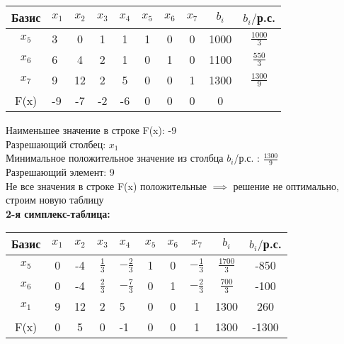 \begin{center}
    \begin{tabular}{|c | g c c c c c c c c|} 
         \hline
            Базис & $x_1$ & $x_2$ & $x_3$ & $x_4$ & $x_5$ & $x_6$ & $x_7$ & $b_i$ & $b_i/$р.с.\\
         \hline
            $x_5$ & 3 & 0 & 1 & 1 & 1 & 0 & 0 & 1000 & $\frac{1000}{3}$\\
         \hline
            $x_6$ & 6 & 4 & 2 & 1 & 0 & 1 & 0 & 1100 & $\frac{550}{3}$ \\
        \hline
            $x_7$ & 9 & 12 & 2 & 5 & 0 & 0 & 1 & 1300 & $\frac{1300}{9}$ \\
         \hline
            F(x) & -9 & -7 & -2 & -6 & 0 & 0 & 0 & 0 &\\
         \hline
    \end{tabular}
\end{center}

\begin{flushleft}
    Наименьшее значение в строке F(x): -9\\
    Разрешающий столбец: $x_1$\\
    Минимальное положительное значение из столбца $b_i$/р.с. : $\frac{1300}{9}$\\
    Разрешающий элемент: 9\\
    Не все значения в строке F(x) положительные $\implies$ решение не оптимально, строим новую таблицу\\
    {\bf2-я симплекс-таблица:}\\
\end{flushleft}

\begin{center}
    \begin{tabular}{|c | c c c g c c c c c|} 
         \hline
            Базис & $x_1$ & $x_2$ & $x_3$ & $x_4$ & $x_5$ & $x_6$ & $x_7$ & $b_i$ & $b_i/$р.с.\\
         \hline
            $x_5$ & 0 & -4 & $\frac{1}{3}$ & $-\frac{2}{3}$ & 1 & 0 & $-\frac{1}{3}$ & $\frac{1700}{3}$ & -850 \\
         \hline
            $x_6$ & 0 & -4 & $\frac{2}{3}$ & $-\frac{7}{3}$ & 0 & 1 & $-\frac{2}{3}$ & $\frac{700}{3}$ & -100 \\
        \hline
            $x_1$ & 9 & 12 & 2 & 5 & 0 & 0 & 1 & 1300 & 260 \\
         \hline
            F(x) & 0 & 5 & 0 & -1 & 0 & 0 & 1 & 1300 & -1300\\
         \hline
    \end{tabular}
\end{center}

